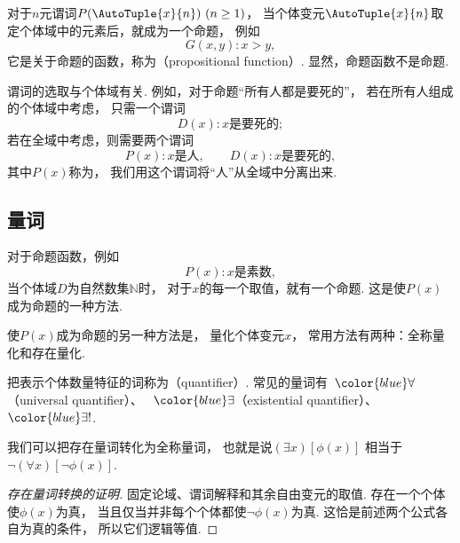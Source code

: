 对于\(n\)元谓词\(P(\AutoTuple{x}{n})\ (n\geq1)\)，
当个体变元\(\AutoTuple{x}{n}\)取定个体域中的元素后，就成为一个命题，
例如\begin{equation*}
	G(x,y):
	x>y,
\end{equation*}
它是关于命题的函数，称为（propositional function）.
显然，命题函数不是命题.

\begin{remark}
谓词的选取与个体域有关.
例如，对于命题“所有人都是要死的”，
若在所有人组成的个体域中考虑，
只需一个谓词\begin{equation*}
	D(x):
	\text{$x$是要死的};
\end{equation*}
若在全域中考虑，则需要两个谓词\begin{equation*}
	P(x):
	\text{$x$是人},
	\qquad
	D(x):
	\text{$x$是要死的},
\end{equation*}
其中\(P(x)\)称为，
我们用这个谓词将“人”从全域中分离出来.
\end{remark}

\subsection{量词}
对于命题函数，例如\begin{equation*}
	P(x):
	\text{$x$是素数},
\end{equation*}
当个体域\(D\)为自然数集\(\mathbb{N}\)时，
对于\(x\)的每一个取值，就有一个命题.
这是使\(P(x)\)成为命题的一种方法.

使\(P(x)\)成为命题的另一种方法是，
量化个体变元\(x\)，
常用方法有两种：全称量化和存在量化.

把表示个体数量特征的词称为（quantifier）.
常见的量词有~\(\color{blue}\forall\)（universal quantifier）、
~\(\color{blue}\exists\)（existential quantifier）、
~\(\color{blue}\exists!\).

我们可以把存在量词转化为全称量词，
也就是说\(
	(\exists x)
	[\phi(x)]
\)
相当于\(
	\neg(\forall x)
	[\neg\phi(x)]
\).

\begin{proof}[存在量词转换的证明]
    固定论域、谓词解释和其余自由变元的取值.
    存在一个个体使\(\phi(x)\)为真，
    当且仅当并非每个个体都使\(\neg\phi(x)\)为真.
    这恰是前述两个公式各自为真的条件，
    所以它们逻辑等值.
\end{proof}

